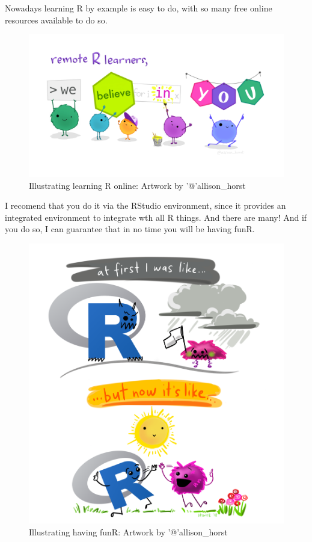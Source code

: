 \documentclass[
]{book}
\begin{document}
Nowadays learning R by example is easy to do, with so many free online resources available to do so.

\begin{figure}
\centering
\includegraphics{extfiles/monster_support.jpg}
\caption{Illustrating learning R online: Artwork by '@'allison\_horst}
\end{figure}

I recomend that you do it via the RStudio environment, since it provides an integrated environment to integrate wth all R things. And there are many! And if you do so, I can guarantee that in no time you will be having funR.

\begin{figure}
\centering
\includegraphics{extfiles/r_first_then.png}
\caption{Illustrating having funR: Artwork by '@'allison\_horst}
\end{figure}
\end{document}
